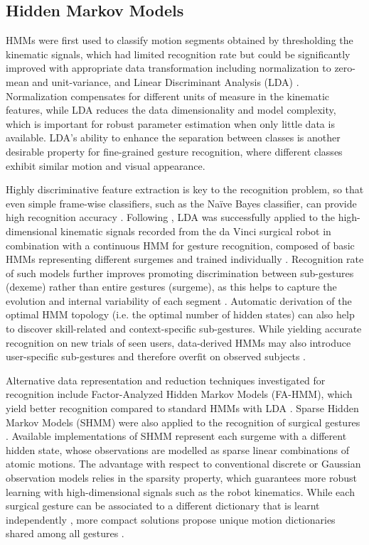 \documentclass[journal]{IEEEtran}
\begin{document}
\subsection{Hidden Markov Models}

HMMs were first used to classify motion segments obtained by thresholding the kinematic signals, which had limited recognition rate but could be significantly improved with appropriate data transformation including normalization to zero-mean and unit-variance, and Linear Discriminant Analysis (LDA) \cite{Murphy2004}.
Normalization compensates for different units of measure in the kinematic features, while LDA reduces the data dimensionality and model complexity, which is important for robust parameter estimation when only little data is available. LDA's ability to enhance the separation between classes is another desirable property for fine-grained gesture recognition, where different classes exhibit similar motion and visual appearance.

Highly discriminative feature extraction is key to the recognition problem, so that even simple frame-wise classifiers, such as the Na\"ive Bayes classifier, can provide high recognition accuracy \cite{Lin2006}. 
Following \cite{Murphy2004}, LDA was successfully applied to the high-dimensional kinematic signals recorded from the da Vinci surgical robot in combination with a continuous HMM for gesture recognition, composed of basic HMMs representing different surgemes and trained individually \cite{Reiley2008, Grigoli2018}.
Recognition rate of such models further improves promoting discrimination between sub-gestures (dexeme) rather than entire gestures (surgeme), as this helps to capture the evolution and internal variability of each segment \cite{Varadarajan2009}. Automatic derivation of the optimal HMM topology (i.e. the optimal number of hidden states) can also help to discover skill-related and context-specific sub-gestures. While yielding accurate recognition on new trials of seen users, data-derived HMMs may also introduce user-specific sub-gestures and therefore overfit on observed subjects \cite{Varadarajan2009}.

Alternative data representation and reduction techniques investigated for recognition include Factor-Analyzed Hidden Markov Models (FA-HMM), which yield better recognition compared to standard HMMs with LDA \cite{Varadarajan2011}. Sparse Hidden Markov Models (SHMM) were also applied to the recognition of surgical gestures \cite{Tao2012, Sefati2015}. Available implementations of SHMM represent each surgeme with a different hidden state, whose observations are modelled as sparse linear combinations of atomic motions. The advantage with respect to conventional discrete \cite{Reiley2009} or Gaussian \cite{Rosen2002, Lin2006, Varadarajan2009} observation models relies in the sparsity property, which guarantees more robust learning with high-dimensional signals such as the robot kinematics. 
While each surgical gesture can be associated to a different dictionary that is learnt independently \cite{Tao2012}, more compact solutions propose unique motion dictionaries shared among all gestures \cite{Sefati2015}.
\end{document}
